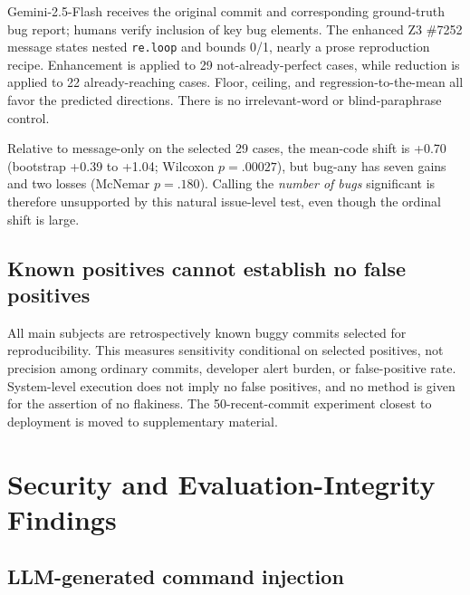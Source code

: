 \documentclass{article}
\begin{document}
Gemini-2.5-Flash receives the original commit and corresponding ground-truth
bug report; humans verify inclusion of key bug elements.  The enhanced Z3
\#7252 message states nested \texttt{re.loop} and bounds 0/1, nearly a prose
reproduction recipe.  Enhancement is applied to 29 not-already-perfect cases,
while reduction is applied to 22 already-reaching cases.  Floor, ceiling, and
regression-to-the-mean all favor the predicted directions.  There is no
irrelevant-word or blind-paraphrase control.

Relative to message-only on the selected 29 cases, the mean-code shift is +0.70
(bootstrap +0.39 to +1.04; Wilcoxon $p=.00027$), but bug-any has seven gains
and two losses (McNemar $p=.180$).  Calling the \emph{number of bugs}
significant is therefore unsupported by this natural issue-level test, even
though the ordinal shift is large.

\subsection{Known positives cannot establish no false positives}

All main subjects are retrospectively known buggy commits selected for
reproducibility.  This measures sensitivity conditional on selected positives,
not precision among ordinary commits, developer alert burden, or false-positive
rate.  System-level execution does not imply no false positives, and no method
is given for the assertion of no flakiness.  The 50-recent-commit experiment
closest to deployment is moved to supplementary material.

\section{Security and Evaluation-Integrity Findings}
\label{sec:security}

\subsection{LLM-generated command injection}
\end{document}

